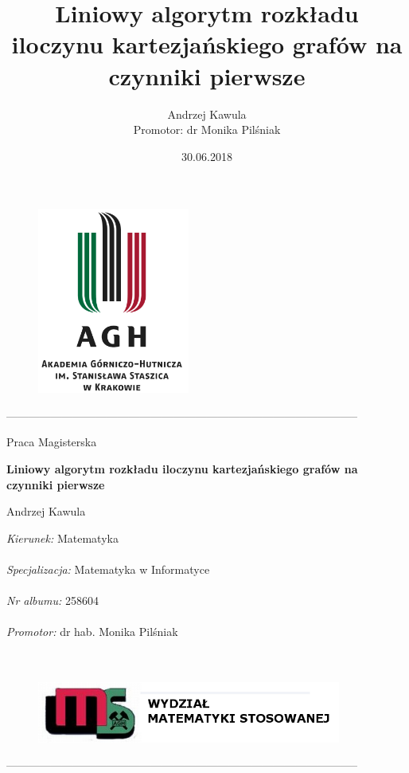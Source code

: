 \documentclass[12pt,a4paper,titlepage]{article}
\title{Liniowy algorytm rozkładu iloczynu kartezjańskiego grafów na czynniki pierwsze}
\date{30.06.2018}
\author{Andrzej Kawula \\ Promotor: dr Monika Pilśniak}
\begin{document}
\thispagestyle{empty}

\begin{figure}[t]
\centering
\includegraphics[width =5cm]{agh.png}
\end{figure}

\begin{center}
-----------------------------------------------------------------------------------------------
\end{center}
\begin{center}

\end{center}
\begin{center}
Praca Magisterska
\end{center}
\begin{center}
\textbf{Liniowy algorytm rozkładu iloczynu kartezjańskiego grafów na czynniki pierwsze}
\end{center}
\begin{center}
Andrzej Kawula
\end{center}
\begin{flushleft}
\end{flushleft}
\textit{Kierunek:} Matematyka\\
\\
\textit{Specjalizacja:} Matematyka w Informatyce \\
\\
\textit{Nr albumu:} 258604 \\
\\
\textit{Promotor:} dr hab. Monika Pilśniak\\
\\
\\
\begin{figure}[h]
\centering
\includegraphics[width = 10cm]{wms.png}
\end{figure}
\begin{center}
-----------------------------------------------------------------------------------------------
\end{center}
\end{document}
